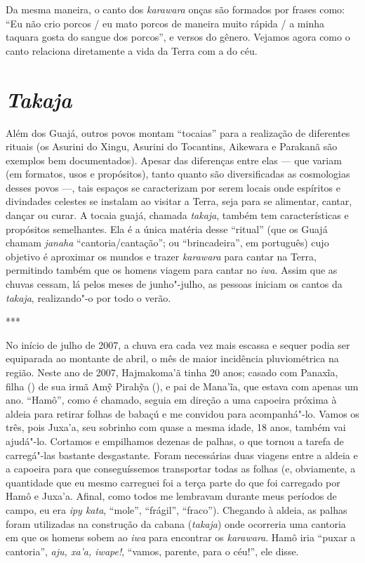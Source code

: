 Da mesma maneira, o canto dos \emph{karawara} onças são formados por
frases como: ``Eu não crio porcos / eu mato porcos de maneira muito
rápida / a minha taquara gosta do sangue dos porcos'', e versos do
gênero. Vejamos agora como o canto relaciona diretamente a vida da Terra
com a do céu.

\section{\emph{Takaja}}\label{takaja}

Além dos Guajá, outros povos montam ``tocaias'' para a realização de
diferentes rituais (os Asurini do Xingu, Asurini do Tocantins, Aikewara
e Parakanã são exemplos bem documentados). Apesar das diferenças entre
elas --- que variam (em formatos, usos e propósitos), tanto quanto são
diversificadas as cosmologias desses povos ---, tais espaços se
caracterizam por serem locais onde espíritos e divindades celestes se
instalam ao visitar a Terra, seja para se alimentar, cantar, dançar ou
curar. A tocaia guajá, chamada \emph{takaja}, também tem características
e propósitos semelhantes. Ela é a única matéria desse ``ritual'' (que os
Guajá chamam \emph{janaha} ``cantoria/cantação''; ou ``brincadeira'', em
português) cujo objetivo é aproximar os mundos e trazer \emph{karawara}
para cantar na Terra, permitindo também que os homens viagem para cantar
no \emph{iwa}. Assim que as chuvas cessam, lá pelos meses de
junho"-julho, as pessoas iniciam os cantos da \emph{takaja}, realizando"-o
por todo o verão.

\begin{center}
***
\end{center}

No início de julho de 2007, a chuva era cada vez mais escassa e sequer
podia ser equiparada ao montante de abril, o mês de maior incidência
pluviométrica na região. Neste ano de 2007, Hajmakoma'ã tinha 20 anos;
casado com Panaxĩa, filha () de sua irmã Amỹ Pirahỹa (), e pai de
Mana'ĩa, que estava com apenas um ano. ``Hamô'', como é chamado, seguia
em direção a uma capoeira próxima à aldeia para retirar folhas de babaçú
e me convidou para acompanhá"-lo. Vamos os três, pois Juxa'a, seu
sobrinho com quase a mesma idade, 18 anos, também vai ajudá"-lo. Cortamos
e empilhamos dezenas de palhas, o que tornou a tarefa de carregá"-las
bastante desgastante. Foram necessárias duas viagens entre a aldeia e a
capoeira para que conseguíssemos transportar todas as folhas (e,
obviamente, a quantidade que eu mesmo carreguei foi a terça parte do que
foi carregado por Hamô e Juxa'a. Afinal, como todos me lembravam durante
meus períodos de campo, eu era \emph{ipy kata}, ``mole'', ``frágil'',
``fraco''). Chegando à aldeia, as palhas foram utilizadas na construção da
cabana (\emph{takaja}) onde ocorreria uma cantoria em que os homens
sobem ao \emph{iwa} para encontrar os \emph{karawara}. Hamô iria ``puxar
a cantoria'', \emph{aju, xa'a, iwape!}, ``vamos, parente, para o céu!'',
ele disse.

